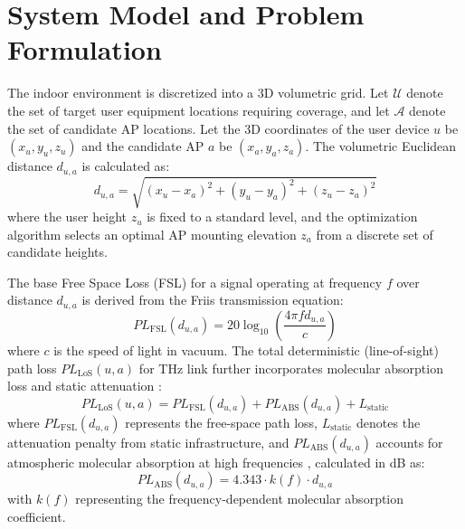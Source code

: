 \documentclass[conference]{IEEEtran}
\begin{document}
	
	\section{System Model and Problem Formulation}
	
	The indoor environment is discretized into a 3D volumetric grid. Let $\mathcal{U}$ denote the set of target user equipment locations requiring coverage, and let $\mathcal{A}$ denote the set of candidate AP locations. Let the 3D coordinates of the user device $u$ be $(x_u, y_u, z_u)$ and the candidate AP $a$ be $(x_a, y_a, z_a)$. The volumetric Euclidean distance $d_{u,a}$ is calculated as:
	\begin{equation}
		d_{u,a} = \sqrt{(x_u - x_a)^2 + (y_u - y_a)^2 + (z_u - z_a)^2}
		\label{eq:3d_distance}
	\end{equation}
	where the user height $z_u$ is fixed to a standard level, and the optimization algorithm selects an optimal AP mounting elevation $z_a$ from a discrete set of candidate heights. 
	
	The base Free Space Loss (FSL) for a signal operating at frequency $f$ over distance $d_{u,a}$ is derived from the Friis transmission equation:
	\begin{equation}
		PL_{\text{FSL}}(d_{u,a}) = 20\log_{10}\left(\frac{4\pi f d_{u,a}}{c}\right)
	\end{equation}
	where $c$ is the speed of light in vacuum. The total deterministic (line-of-sight) path loss $PL_{\text{LoS}}(u,a)$ for THz link further incorporates molecular absorption loss and static attenuation \cite{b1}:
	\begin{equation}
		PL_{\text{LoS}}(u,a) = PL_{\text{FSL}}(d_{u,a}) + PL_{\text{ABS}}(d_{u,a}) + L_{\text{static}}
		\label{eq:total_pl}
	\end{equation}
	where $PL_{\text{FSL}}(d_{u,a})$ represents the free-space path loss, $L_{\text{static}}$ denotes the attenuation penalty from static infrastructure, and $PL_{\text{ABS}}(d_{u,a})$ accounts for atmospheric molecular absorption at high frequencies \cite{b2}, calculated in dB as:
	\begin{equation}
		PL_{\text{ABS}}(d_{u,a}) = 4.343 \cdot k(f) \cdot d_{u,a}
	\end{equation}
	with $k(f)$ representing the frequency-dependent molecular absorption coefficient.
	
\end{document}
